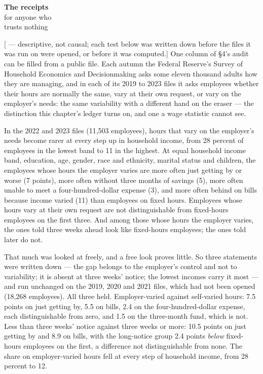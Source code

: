 \begin{receipts}{\textbf{The receipts}\\for anyone who\\trusts nothing}


{\sffamily\fontsize{8.6}{12.2}\selectfont\color{trackc}[ --- descriptive, not causal; each test below was written down
before the files it was run on were opened, or before it was
computed.]} One column of §4's audit
can be filled from a public file. Each autumn the Federal Reserve's
Survey of Household Economics and Decisionmaking asks some eleven
thousand adults how they are managing, and in each of its 2019 to 2023
files it asks employees whether their hours are normally the same,
vary at their own request, or vary on the employer's needs: the same
variability with a different hand on the eraser --- the distinction this
chapter's ledger turns on, and one a wage statistic cannot see.

In the 2022 and 2023 files (11,503 employees), hours that vary on the
employer's needs become rarer at every step up in household income,
from 28 percent of employees in the lowest band to 11 in the highest.
At equal household income band, education, age, gender, race and
ethnicity, marital status and children, the employees whose hours the
employer varies are more often just getting by or worse (7 points),
more often without three months of savings (5), more often unable to
meet a four-hundred-dollar expense (3), and more often behind on bills
because income varied (11) than employees on fixed hours. Employees
whose hours vary at their own request are not distinguishable from
fixed-hours employees on the first three. And among those whose hours
the employer varies, the ones told three weeks ahead look like
fixed-hours employees; the ones told later do not.

That much was looked at freely, and a free look proves little. So
three statements were written down --- the gap belongs to the employer's
control and not to variability; it is absent at three weeks' notice;
the lowest incomes carry it most --- and run unchanged on the 2019, 2020
and 2021 files, which had not been opened (18,268 employees). All
three held. Employer-varied against self-varied hours: 7.5 points on
just getting by, 5.5 on bills, 2.4 on the four-hundred-dollar expense,
each distinguishable from zero, and 1.5 on the three-month fund, which
is not. Less than three weeks' notice against three weeks or more:
10.5 points on just getting by and 8.9 on bills, with the long-notice
group 2.4 points \emph{below} fixed-hours employees on the first, a
difference not distinguishable from none. The share on employer-varied
hours fell at every step of household income, from 28 percent to 12.


\end{receipts}
